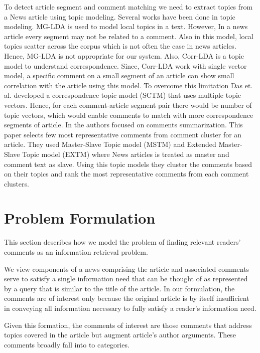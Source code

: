 \documentclass[article]{IEEEtran}
\begin{document}
To detect article segment and comment matching we need to extract topics from a News article using topic modeling. Several works have been done in topic modeling. MG-LDA \cite{Blei:2003:MAD:860435.860460, Titov:2008:MOR:1367497.1367513} is used to model local topics in a text. However, In a news article every segment may not be related to a comment. Also in this model, local topics scatter across the corpus which is not often the case in news articles. Hence, MG-LDA is not appropriate for our system. Also, Corr-LDA \cite{Titov:2008:MOR:1367497.1367513} is a topic model to understand correspondence. Since, Corr-LDA work with single vector model, a specific comment on a small segment of an article can show small correlation with the article using this model. To overcome this limitation Das et. al. \cite{Das:2014:GBC:2556195.2556231} developed a correspondence topic model (SCTM) that uses multiple topic vectors. Hence, for each comment-article segment pair there would be number of topic vectors, which would enable comments to match with more correspondence segments of article. In \cite{Ma:2012:TRC:2396761.2396798} the authors focused on comments summarization. This paper selects few most representative comments from comment cluster for an article. They used Master-Slave Topic model (MSTM) and Extended Master-Slave Topic model (EXTM) where News articles is treated as master and comment text as slave. Using this topic models they cluster the comments based on their topics and rank the most representative comments from each comment clusters. 

\section{Problem Formulation}
\label{pf}
This section describes how we model the problem of finding relevant readers' comments as an information retrieval problem.

We view components of a news comprising the article and associated comments serve to satisfy a single information need that can be thought of as represented by a query that is similar to the title of the article. In our formulation, the comments are of interest only because the original article is by itself insufficient in conveying all information necessary to fully satisfy a reader's information need. 

Given this formation, the comments of interest are those comments that address topics covered in the article but augment article's author arguments. These comments broadly fall into to categories.  
\end{document}
